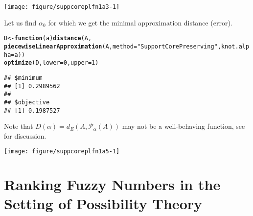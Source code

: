 \documentclass[11pt]{article}\usepackage[]{graphicx}\usepackage[]{color}
\makeatletter
\newcommand{\hlnum}[1]{\textcolor[rgb]{0.686,0.059,0.569}{#1}}%
\newcommand{\hlstr}[1]{\textcolor[rgb]{0.192,0.494,0.8}{#1}}%
\newcommand{\hlstd}[1]{\textcolor[rgb]{0.345,0.345,0.345}{#1}}%
\newcommand{\hlkwa}[1]{\textcolor[rgb]{0.161,0.373,0.58}{\textbf{#1}}}%
\newcommand{\hlkwb}[1]{\textcolor[rgb]{0.69,0.353,0.396}{#1}}%
\newcommand{\hlkwc}[1]{\textcolor[rgb]{0.333,0.667,0.333}{#1}}%
\newcommand{\hlkwd}[1]{\textcolor[rgb]{0.737,0.353,0.396}{\textbf{#1}}}%
\newenvironment{kframe}{%
 \def\at@end@of@kframe{}%
 \ifinner\ifhmode%
  \def\at@end@of@kframe{\end{minipage}}%
  \begin{minipage}{\columnwidth}%
 \fi\fi%
 \def\FrameCommand##1{\hskip\@totalleftmargin \hskip-\fboxsep
 \colorbox{shadecolor}{##1}\hskip-\fboxsep
     \hskip-\linewidth \hskip-\@totalleftmargin \hskip\columnwidth}%
 \MakeFramed {\advance\hsize-\width
   \@totalleftmargin\z@ \linewidth\hsize
   \@setminipage}}%
 {\par\unskip\endMakeFramed%
 \at@end@of@kframe}
\newenvironment{knitrout}{}{} %
\makeatother
\begin{document}
\begin{center}
\begin{knitrout}\small
{}\color{fgcolor}

{\centering \texttt{[image: figure/suppcoreplfn1a3-1]} 

}



\end{knitrout}
\end{center}

Let us find $\alpha_0$ for which we get the minimal approximation
distance (error).

\begin{knitrout}\small
{}\color{fgcolor}\begin{kframe}
\begin{alltt}
\hlstd{D} \hlkwb{<-} \hlkwa{function}\hlstd{(}\hlkwc{a}\hlstd{)} \hlkwd{distance}\hlstd{(A,}
   \hlkwd{piecewiseLinearApproximation}\hlstd{(A,} \hlkwc{method}\hlstd{=}\hlstr{"SupportCorePreserving"}\hlstd{,} \hlkwc{knot.alpha}\hlstd{=a))}
\hlkwd{optimize}\hlstd{(D,} \hlkwc{lower}\hlstd{=}\hlnum{0}\hlstd{,} \hlkwc{upper}\hlstd{=}\hlnum{1}\hlstd{)}
\end{alltt}
\begin{verbatim}
## $minimum
## [1] 0.2989562
## 
## $objective
## [1] 0.1987527
\end{verbatim}
\end{kframe}
\end{knitrout}

Note that $D(\alpha)=d_E(A,\mathcal{P}_\alpha(A))$ may not be a well-behaving function, see
\cite{CoroianuETAL2014:piecewise1suppcore} for discussion.

\begin{center}
\begin{knitrout}\small
{}\color{fgcolor}

{\centering \texttt{[image: figure/suppcoreplfn1a5-1]} 

}



\end{knitrout}
\end{center}

\section{Ranking Fuzzy Numbers in the Setting of Possibility Theory}
\end{document}
